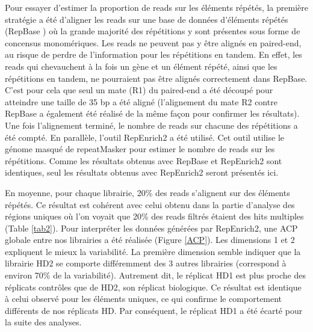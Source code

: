 \documentclass[a4paper,12pt,times]{report}
\begin{document}
   \bigskip
    Pour essayer d'estimer la proportion de reads sur les éléments répétés, la première stratégie a été d'aligner les reads sur une base de données d'éléments répétés (RepBase \cite{repbase}) où la grande majorité des répétitions y sont présentes sous forme de concensus monomériques.
    Les reads ne peuvent pas y être alignés en paired-end, au risque de perdre de l'information pour les répétitions en tandem. 
    En effet, les reads qui chevauchent à la fois un gène et un élément répété, ainsi que les répétitions en tandem, ne pourraient pas être alignés correctement dans RepBase.
    C'est pour cela que seul un mate (R1) du paired-end a été découpé pour atteindre une taille de 35 bp a été aligné (l'alignement du mate R2 contre RepBase a également été réalisé de la même façon pour confirmer les résultats).
 Une fois l'alignement terminé, le nombre de reads sur chacune des répétitions a été compté.
   \newline En parallèle, l'outil RepEnrich2 \cite{pmid25012247} a été utilisé.  Cet outil utilise le génome masqué de repeatMasker pour estimer le nombre de reads sur les répétitions.
   \newline Comme les résultats obtenus avec RepBase et RepEnrich2 sont identiques, seul les résultats obtenus avec RepEnrich2 seront présentés ici.
   
    \bigskip
    En moyenne, pour chaque librairie,  20\% des reads s'alignent sur des éléments répétés. Ce résultat est cohérent avec celui obtenu dans la partie d'analyse des régions uniques où l'on voyait que 20\% des reads filtrés étaient des hits multiples (Table \ref{tab2}).
    \newline
    Pour interpréter  les données générées par RepEnrich2, une ACP globale entre nos librairies a été réalisée (Figure \ref{ACP}).  
    Les dimensions 1 et 2  expliquent le mieux la variabilité.
    La première dimension semble indiquer que la librairie HD2 se comporte différemment des 3 autres librairies (correspond à environ 70\% de la variabilité). Autrement dit, le réplicat HD1 est plus proche des réplicats contrôles que de HD2, son réplicat biologique.
  Ce résultat est identique à celui observé pour les éléments uniques, ce qui confirme le comportement différents de nos réplicats HD.
   Par conséquent, le réplicat HD1 a été écarté pour la suite des analyses.
  
  
   
\end{document}
